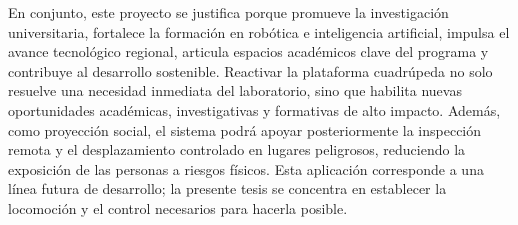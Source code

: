 En conjunto, este proyecto se justifica porque promueve la investigación universitaria, fortalece la formación en robótica e inteligencia artificial, impulsa el avance tecnológico regional, articula espacios académicos clave del programa y contribuye al desarrollo sostenible. Reactivar la plataforma cuadrúpeda no solo resuelve una necesidad inmediata del laboratorio, sino que habilita nuevas oportunidades académicas, investigativas y formativas de alto impacto. Además, como proyección social, el sistema podrá apoyar posteriormente la inspección remota y el desplazamiento controlado en lugares peligrosos, reduciendo la exposición de las personas a riesgos físicos. Esta aplicación corresponde a una línea futura de desarrollo; la presente tesis se concentra en establecer la locomoción y el control necesarios para hacerla posible.
